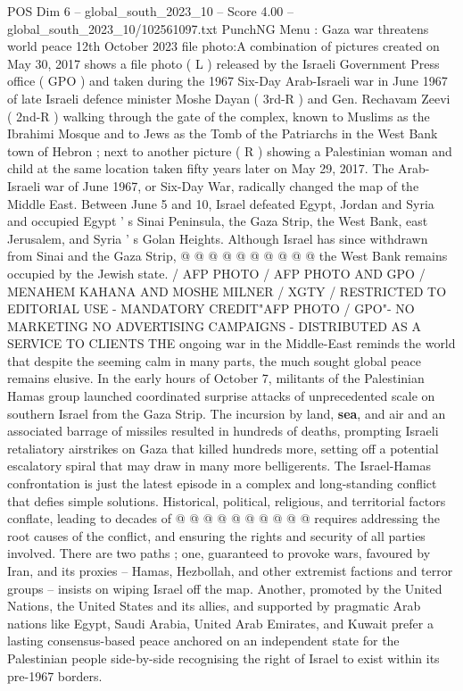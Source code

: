 \begin{textsample}{POS Dim 6 – global\_south\_2023\_10 – Score 4.00 – global\_south\_2023\_10/102561097.txt}  \label{ex:f6_pos_293}
PunchNG Menu : Gaza war threatens world peace 12th October 2023 file photo:A combination of pictures created on May 30, 2017 shows a file photo ( L ) released by the Israeli Government Press office ( GPO ) and taken during the 1967 Six-Day Arab-Israeli war in June 1967 of late Israeli defence minister Moshe Dayan ( 3rd-R ) and Gen.
Rechavam Zeevi ( 2nd-R ) walking through the gate of the complex, known to Muslims as the Ibrahimi Mosque and to Jews as the Tomb of the Patriarchs in the West Bank town of Hebron ; next to another picture ( R ) showing a Palestinian woman and child at the same location taken fifty years later on May 29, 2017.
The Arab-Israeli war of June 1967, or Six-Day War, radically changed the map of the Middle East.
Between June 5 and 10, Israel defeated Egypt, Jordan and Syria and occupied Egypt ' s Sinai Peninsula, the Gaza Strip, the West Bank, east Jerusalem, and Syria ' s Golan Heights.
Although Israel has since withdrawn from Sinai and the Gaza Strip, @ @ @ @ @ @ @ @ @ @ the West Bank remains occupied by the Jewish state. / AFP PHOTO / AFP PHOTO AND GPO / MENAHEM KAHANA AND MOSHE MILNER / XGTY / RESTRICTED TO EDITORIAL USE - MANDATORY CREDIT"AFP PHOTO / GPO"- NO MARKETING NO ADVERTISING CAMPAIGNS - DISTRIBUTED AS A SERVICE TO CLIENTS THE ongoing war in the Middle-East reminds the world that despite the seeming calm in many parts, the much sought global peace remains elusive.
In the early hours of October 7, militants of the Palestinian Hamas group launched coordinated surprise attacks of unprecedented scale on southern Israel from the Gaza Strip.
The incursion by land, \textbf{sea}, and air and an associated barrage of missiles resulted in hundreds of deaths, prompting Israeli retaliatory airstrikes on Gaza that killed hundreds more, setting off a potential escalatory spiral that may draw in many more belligerents.
The Israel-Hamas confrontation is just the latest episode in a complex and long-standing conflict that defies simple solutions.
Historical, political, religious, and territorial factors conflate, leading to decades of @ @ @ @ @ @ @ @ @ @ requires addressing the root causes of the conflict, and ensuring the rights and security of all parties involved.
There are two paths ; one, guaranteed to provoke wars, favoured by Iran, and its proxies -- Hamas, Hezbollah, and other extremist factions and terror groups -- insists on wiping Israel off the map.
Another, promoted by the United Nations, the United States and its allies, and supported by pragmatic Arab nations like Egypt, Saudi Arabia, United Arab Emirates, and Kuwait prefer a lasting consensus-based peace anchored on an independent state for the Palestinian people side-by-side recognising the right of Israel to exist within its pre-1967 borders.

\end{textsample}
